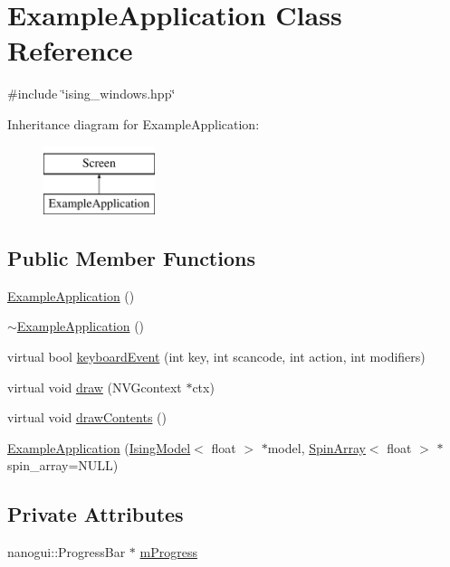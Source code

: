 \hypertarget{classExampleApplication}{}\section{Example\+Application Class Reference}
\label{classExampleApplication}


{\ttfamily \#include \char`\"{}ising\+\_\+windows.\+hpp\char`\"{}}

Inheritance diagram for Example\+Application\+:\begin{figure}[H]
\begin{center}
\leavevmode
\includegraphics[height=2.000000cm]{classExampleApplication}
\end{center}
\end{figure}
\subsection*{Public Member Functions}
\begin{DoxyCompactItemize}
\item 
\mbox{\hyperlink{classExampleApplication_a3fb3b3b1dd4820cc3290944879ecb6d2}{Example\+Application}} ()
\item 
\mbox{\hyperlink{classExampleApplication_aacd4040918ad68dd2688d38dff8f57be}{$\sim$\+Example\+Application}} ()
\item 
virtual bool \mbox{\hyperlink{classExampleApplication_a79821271b7d486f2727c42ad9d385ba4}{keyboard\+Event}} (int key, int scancode, int action, int modifiers)
\item 
virtual void \mbox{\hyperlink{classExampleApplication_a4fa26138de0a6f65e6b1ccae17f26f9d}{draw}} (N\+V\+Gcontext $\ast$ctx)
\item 
virtual void \mbox{\hyperlink{classExampleApplication_a75d765000cca185faf56af2db9472d19}{draw\+Contents}} ()
\item 
\mbox{\hyperlink{classExampleApplication_adb53fe47e1c5d9cf00c3173a586a5c19}{Example\+Application}} (\mbox{\hyperlink{classIsingModel}{Ising\+Model}}$<$ float $>$ $\ast$model, \mbox{\hyperlink{classSpinArray}{Spin\+Array}}$<$ float $>$ $\ast$spin\+\_\+array=N\+U\+LL)
\end{DoxyCompactItemize}
\subsection*{Private Attributes}
\begin{DoxyCompactItemize}
\item 
nanogui\+::\+Progress\+Bar $\ast$ \mbox{\hyperlink{classExampleApplication_a0f3364dd56cbc31539b750aebd0c6a5a}{m\+Progress}}
\end{DoxyCompactItemize}


